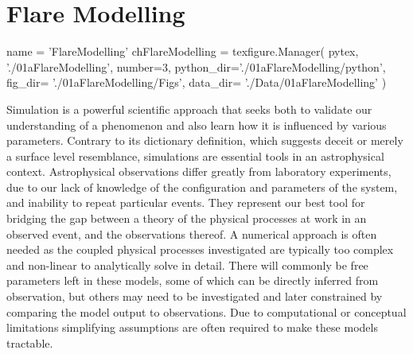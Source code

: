 \chapter{Flare Modelling}\label{Chap:FlareModelling}
\begin{pycode}[FlareModelling]
name = 'FlareModelling'
chFlareModelling = texfigure.Manager(
    pytex,
    './01aFlareModelling',
    number=3,
    python_dir='./01aFlareModelling/python',
    fig_dir=   './01aFlareModelling/Figs',
    data_dir=  './Data/01aFlareModelling'
)
\end{pycode}


Simulation is a powerful scientific approach that seeks both to validate our understanding of a phenomenon and also learn how it is influenced by various parameters.
Contrary to its dictionary definition, which suggests deceit or merely a surface level resemblance, simulations are essential tools in an astrophysical context.
Astrophysical observations differ greatly from laboratory experiments, due to our lack of knowledge of the configuration and parameters of the system, and inability to repeat particular events.
They represent our best tool for bridging the gap between a theory of the physical processes at work in an observed event, and the observations thereof.
A numerical approach is often needed as the coupled physical processes investigated are typically too complex and non-linear to analytically solve in detail.
There will commonly be free parameters left in these models, some of which can be directly inferred from observation, but others may need to be investigated and later constrained by comparing the model output to observations.
Due to computational or conceptual limitations simplifying assumptions are often required to make these models tractable.




